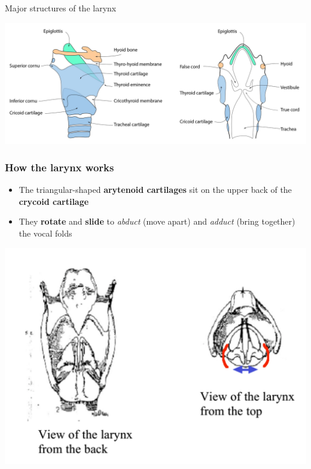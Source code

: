 \documentclass[professionalfonts]{beamer}
\begin{document}
\begin{frame}{Major structures of the larynx}
    \begin{center}
        \includegraphics[width = \textwidth]{figs/LarynxStructures_Major.png}
    \end{center}
\end{frame}

\begin{frame}
    \frametitle{How the larynx works}
    \begin{multicols}{2}
        
    \begin{itemize}
        \item The triangular-shaped \textbf{arytenoid cartilages} sit on the upper back of the \textbf{crycoid cartilage}
        \item They \textbf{rotate} and \textbf{slide} to \textit{abduct} (move apart) and \textit{adduct} (bring together) the vocal folds
    \end{itemize}

    \columnbreak
    
    \includegraphics[width = \linewidth]{figs/Cartilages.png}

    \end{multicols}
\end{frame}
\end{document}
